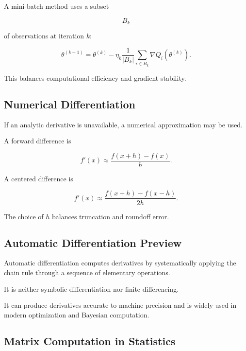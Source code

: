 A mini-batch method uses a subset

\[
B_k
\]

of observations at iteration \(k\):

\[
\boxed{
\theta^{(k+1)}
=
\theta^{(k)}
-
\eta_k
\frac1{|B_k|}
\sum_{i\in B_k}
\nabla Q_i
(
\theta^{(k)}
).
}
\]

This balances computational efficiency and gradient stability.

\subsection{Numerical Differentiation}
\label{subsec:numerical-differentiation-statistics}

If an analytic derivative is unavailable, a numerical approximation may
be used.

A forward difference is

\[
\boxed{
f'(x)
\approx
\frac{
f(x+h)-f(x)
}{
h
}.
}
\]

A centered difference is

\[
\boxed{
f'(x)
\approx
\frac{
f(x+h)-f(x-h)
}{
2h
}.
}
\]

The choice of \(h\) balances truncation and roundoff error.

\subsection{Automatic Differentiation Preview}
\label{subsec:automatic-differentiation}

Automatic differentiation computes derivatives by systematically applying
the chain rule through a sequence of elementary operations.

It is neither symbolic differentiation nor finite differencing.

It can produce derivatives accurate to machine precision and is widely
used in modern optimization and Bayesian computation.

\subsection{Matrix Computation in Statistics}
\label{subsec:matrix-computation-statistics}

